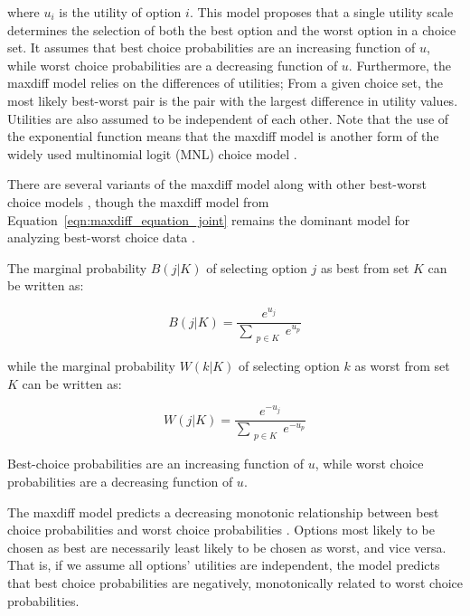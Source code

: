 where $u_{i}$ is the utility of option $i$. This model proposes that a single utility scale determines the selection of both the best option and the worst option in a choice set. It assumes that best choice probabilities are an increasing function of $u$, while worst choice probabilities are a decreasing function of $u$. Furthermore, the maxdiff model relies on the differences of utilities; From a given choice set, the most likely best-worst pair is the pair with the largest difference in utility values. Utilities are also assumed to be independent of each other. Note that the use of the exponential function means that the maxdiff model is another form of the widely used multinomial logit (MNL) choice model \parencite{hausman1984specification}. 

There are several variants of the maxdiff model along with other best-worst choice models \parencite{marleyProbabilisticModelsBest2005,marleyProbabilisticModelsSetdependent2008,marleyModelsBestWorst2012,flynnBestWorstScaling2007,flynn2014best}, though the maxdiff model from Equation~\ref{eqn:maxdiff_equation_joint} remains the dominant model for analyzing best-worst choice data \parencite{hawkinsBestTimesWorst2014}.

The marginal probability $B(j|K)$ of selecting option $j$ as best from set $K$ can be written as:

\begin{equation}
   B(j|K)=\frac{e^{u_{j}}}{\sum_{\substack{{p}\in K}} e^{u_{p}}}
\end{equation}

while the marginal probability $W(k|K)$ of selecting option $k$ as worst from set $K$ can be written as:

\begin{equation}
   W(j|K)=\frac{e^{-u_{j}}}{\sum_{\substack{{p}\in K}} e^{-u_{p}}}
\end{equation}

Best-choice probabilities are an increasing function of $u$, while worst choice probabilities are a decreasing function of $u$.

The maxdiff model predicts a decreasing monotonic relationship between best choice probabilities and worst choice probabilities \parencite{hawkinsBestTimesWorst2014}. Options most likely to be chosen as best are necessarily least likely to be chosen as worst, and vice versa. That is, if we assume all options' utilities are independent, the model predicts that best choice probabilities are negatively, monotonically related to worst choice probabilities. 

